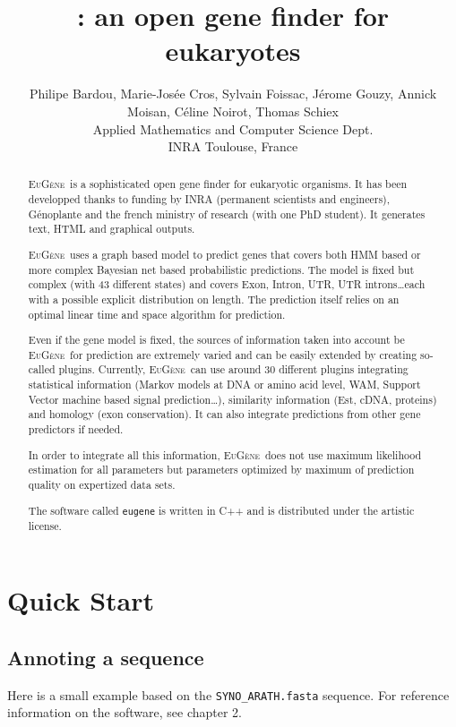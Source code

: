 \documentclass[a4paper,titlepage]{report}
\author{Philipe Bardou, Marie-Jos\'ee Cros, Sylvain Foissac, J\'erome Gouzy, Annick Moisan, C\'eline Noirot, Thomas Schiex \\ Applied Mathematics and Computer Science Dept.\\ INRA Toulouse, France}
\title{\EuGene: an open gene finder for eukaryotes}
\newcommand{\EuGene}{\textsc{EuG\`ene}}
\begin{document}
\maketitle
\tableofcontents

\begin{abstract}
  \EuGene\ is a sophisticated open gene finder for eukaryotic
  organisms. It has been developped thanks to funding by INRA
  (permanent scientists and engineers), G\'enoplante and the french
  ministry of research (with one PhD student). It generates text, HTML
  and graphical outputs.
  
  \EuGene\ uses a graph based model to predict genes that covers both
  HMM based or more complex Bayesian net based probabilistic
  predictions. The model is fixed but complex (with 43 different
  states) and covers Exon, Intron, UTR, UTR introns\ldots each with a
  possible explicit distribution on length. The prediction itself
  relies on an optimal linear time and space algorithm for prediction.
  
  Even if the gene model is fixed, the sources of information taken
  into account be \EuGene\ for prediction are extremely varied and can
  be easily extended by creating so-called plugins. Currently,
  \EuGene\ can use around 30 different plugins integrating statistical
  information (Markov models at DNA or amino acid level, WAM, Support
  Vector machine based signal prediction\ldots), similarity information
  (Est, cDNA, proteins) and homology (exon conservation). It can also
  integrate predictions from other gene predictors if needed.
  
  In order to integrate all this information, \EuGene\ does not use
  maximum likelihood estimation for all parameters but parameters
  optimized by maximum of prediction quality on expertized data sets.

  The software called \texttt{eugene} is written in C++ and is distributed 
  under the artistic license.
 \end{abstract}

\chapter{Quick Start}

\section{Annoting a sequence}
Here is a small example based on the \texttt{SYNO\_ARATH.fasta} sequence.
For reference information on the software, see chapter 2.
\end{document}
